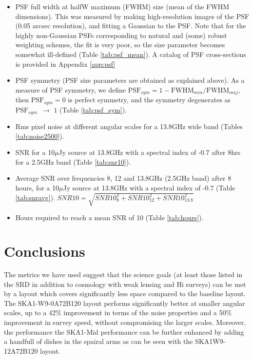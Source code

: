 \documentclass[sfheadings,a4paper,times,9pt,floats,floatfix]{article}
\begin{document}
\begin{itemize}
 \item PSF full width at halfW maximum (FWHM) size (mean of the FWHM dimensions). This was measured by making high-resolution
images of the PSF (0.05 arcsec
resolution), and fitting a Gaussian to the PSF. Note that for the highly non-Gaussian PSFs corresponding to natural and (some)
robust weighting schemes, the fit is very poor, so the size parameter becomes somewhat ill-defined (Table \ref{tab:psf_mean}).
A catalog of PSF cross-sections is provided in Appendix \ref{app:psf}

 \item PSF symmetry (PSF size parameters are obtained as explained above). As a measure of PSF symmetry, we define 
$\text{PSF}_{sym}=1-\text{FWHM}_{min}/\text{FWHM}_{maj}$, then $\text{PSF}_{sym} = 0$ is perfect symmetry, and the symmetry
degenerates as $\text{PSF}_{sym}\,\,\, \rightarrow\,\,1$ (Table \ref{tab:psf_sym}).

 \item Rms pixel noise at different angular scales for a 13.8GHz wide band (Tables \ref{tab:noise2500}).
 
 \item SNR for a 10$\mu$Jy source at 13.8GHz with a spectral index of -0.7 after 8hrs for a 2.5GHz band (Table \ref{tab:snr10}).
 \item Average SNR over frequencies 8, 12 and 13.8GHz (2.5GHz band)
   after 8 hours, for a 10$\mu$Jy source at 13.8GHz
with a spectral index of -0.7 (Table \ref{tab:snravg}). {$\overline{SNR10}=\sqrt{SNR10_{8}^2 + SNR10_{12}^2 +
SNR10_{13.8}^2}$}
 \item Hours required to reach a mean SNR of 10 (Table \ref{tab:hours}).
\end{itemize}






\newpage
\section{Conclusions}\label{sec:conclusion}
The metrics we have used suggest that the science goals (at least those listed in the SRD in addition to cosmology with weak
lensing and H{\sc i} surveys) can be met by a layout which covers significantly less space compared to the baseline layout. The
SKA1-W9-0A72B120 layout performs significantly better at smaller angular scales, up to a 42\% improvement in terms of the noise
properties and a 50\% improvement in survey speed, without compromising the larger scales. Moreover, the performance the
SKA1-Mid performance can be further enhanced by adding a handfull of dishes in the spairal arms as can be seen
with the SKA1W9-12A72B120 layout.
\end{document}

